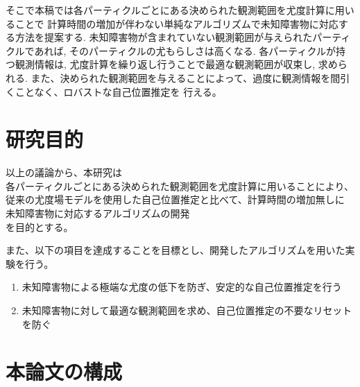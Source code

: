 そこで本稿では各パーティクルごとにある決められた観測範囲を尤度計算に用いることで
計算時間の増加が伴わない単純なアルゴリズムで未知障害物に対応する方法を提案する. 
未知障害物が含まれていない観測範囲が与えられたパーティクルであれば, 
そのパーティクルの尤もらしさは高くなる. 
各パーティクルが持つ観測情報は, 尤度計算を繰り返し行うことで最適な観測範囲が収束し, 求められる. 
また、決められた観測範囲を与えることによって、過度に観測情報を間引くことなく、ロバストな自己位置推定を
行える。

\section{研究目的}
以上の議論から、本研究は\\
各パーティクルごとにある決められた観測範囲を尤度計算に用いることにより、
従来の尤度場モデルを使用した自己位置推定と比べて、計算時間の増加無しに
未知障害物に対応するアルゴリズムの開発\\
を目的とする。

また、以下の項目を達成することを目標とし、開発したアルゴリズムを用いた実験を行う。

\begin{enumerate}
  \item 未知障害物による極端な尤度の低下を防ぎ、安定的な自己位置推定を行う
  \item 未知障害物に対して最適な観測範囲を求め、自己位置推定の不要なリセットを防ぐ
\end{enumerate}

\section{本論文の構成}
